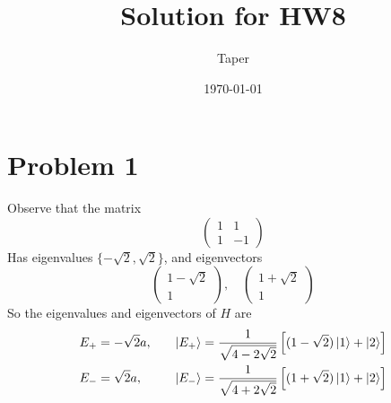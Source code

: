 \documentclass{article}
\title{Solution for HW8}
\date{\today}
\author{Taper}
\begin{document}
\maketitle
{}
\section*{Problem 1}
Observe that the matrix
$$ \begin{pmatrix}
    1 & 1 \\
    1 & -1 
\end{pmatrix}$$
Has eigenvalues $\{-\sqrt{2},\sqrt{2}\}$, and eigenvectors
$$
\begin{pmatrix}
    1-\sqrt{2}\\ 1
\end{pmatrix},\quad \begin{pmatrix}
                        1+\sqrt{2}\\ 1
                    \end{pmatrix}
$$
So the eigenvalues and eigenvectors of $H$ are
\begin{align}
    & E_+=-\sqrt{2}a,\quad
    &\ket{E_+}=\frac{1}{\sqrt{4-2\sqrt{2}}}\left[
        (1-\sqrt{2})\ket{1} + \ket{2} \right] \\
    & E_-=\sqrt{2}a,\quad
    &\ket{E_-}=\frac{1}{\sqrt{4+2\sqrt{2}}}\left[
        (1+\sqrt{2})\ket{1} + \ket{2} \right]
\end{align}
\end{document}
